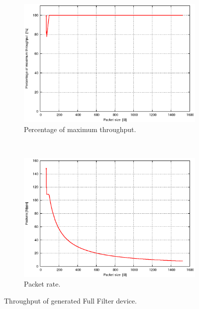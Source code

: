 \begin{figure}
    \centering
    \begin{subfigure}[b]{0.8\textwidth}
        \includegraphics[width=\textwidth]{chapters/pic/graphs/h2rc-cases/full_throughput}
        \caption{Percentage of maximum throughput.}
        \label{fig:bitThroughputFull}
    \end{subfigure}
    ~
    \begin{subfigure}[b]{0.8\textwidth}
        \includegraphics[width=\textwidth]{chapters/pic/graphs/h2rc-cases/full_mpps_throughput}
        \caption{Packet rate.}
        \label{fig:packetThroughputFull}
    \end{subfigure}
    
    \caption{Throughput of generated Full Filter device.}
    \label{fig:FullThroughput}
\end{figure}

